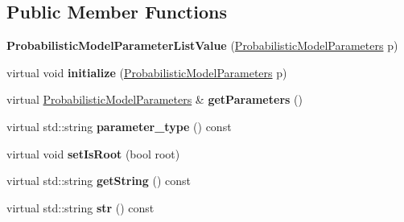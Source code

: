 \subsection*{Public Member Functions}
\begin{DoxyCompactItemize}
\item 
\mbox{\label{classtops_1_1ProbabilisticModelParameterListValue_a2c173dbde86c66d36f494b4519c779bc}} 
{\bfseries Probabilistic\+Model\+Parameter\+List\+Value} (\hyperlink{classtops_1_1ProbabilisticModelParameters}{Probabilistic\+Model\+Parameters} p)
\item 
\mbox{\label{classtops_1_1ProbabilisticModelParameterListValue_ab66d8c36cece4724e8e2334c57b09f29}} 
virtual void {\bfseries initialize} (\hyperlink{classtops_1_1ProbabilisticModelParameters}{Probabilistic\+Model\+Parameters} p)
\item 
\mbox{\label{classtops_1_1ProbabilisticModelParameterListValue_a5e7ef713d6a0af4330c74003af1dd589}} 
virtual \hyperlink{classtops_1_1ProbabilisticModelParameters}{Probabilistic\+Model\+Parameters} \& {\bfseries get\+Parameters} ()
\item 
\mbox{\label{classtops_1_1ProbabilisticModelParameterListValue_a9e8de9689a788d5549c31d639fc15771}} 
virtual std\+::string {\bfseries parameter\+\_\+type} () const
\item 
\mbox{\label{classtops_1_1ProbabilisticModelParameterListValue_aeaf6e0d935c0f53251aa6f7b581c4047}} 
virtual void {\bfseries set\+Is\+Root} (bool root)
\item 
\mbox{\label{classtops_1_1ProbabilisticModelParameterListValue_a499b2c748f7f59d37fd866f900a010e8}} 
virtual std\+::string {\bfseries get\+String} () const
\item 
\mbox{\label{classtops_1_1ProbabilisticModelParameterListValue_a46098bb6954637fdc51a85c83bbf66f5}} 
virtual std\+::string {\bfseries str} () const
\end{DoxyCompactItemize}


